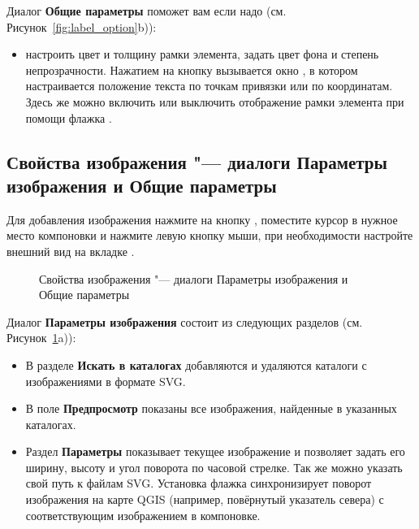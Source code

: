 
Диалог \textbf{Общие параметры} поможет вам если надо
(см. Рисунок~\ref{fig:label_option}b)):

\begin{itemize}[label=--]
\item настроить цвет и толщину рамки элемента, задать
цвет фона и степень непрозрачности. Нажатием на кнопку 
вызывается окно , в котором настраивается
положение текста по точкам привязки или по координатам. Здесь же можно
включить или выключить отображение рамки элемента при помощи флажка
.
\end{itemize}

\subsection{Свойства изображения "--- диалоги Параметры изображения и Общие параметры}

Для добавления изображения нажмите на кнопку
, поместите
курсор в нужное место компоновки и нажмите левую кнопку мыши, при
необходимости настройте внешний вид на вкладке .

\begin{figure}[ht]
\centering
     \hspace{1cm}
   \caption{Свойства изображения "--- диалоги Параметры изображения и Общие параметры \nixcaption}\label{fig:imageoptions}
\end{figure}


Диалог \textbf{Параметры изображения} состоит из следующих
разделов (см. Рисунок~\ref{fig:imageoptions}a)):

\begin{itemize}[label=--]
\item В разделе \textbf{Искать в каталогах} добавляются и удаляются
каталоги с изображениями в формате SVG.
\item В поле \textbf{Предпросмотр} показаны все изображения, найденные
в указанных каталогах.
\item Раздел \textbf{Параметры} показывает текущее изображение и
позволяет задать его ширину, высоту и угол поворота по часовой стрелке.
Так же можно указать свой путь к файлам SVG. Установка флажка
 синхронизирует поворот изображения
на карте QGIS (например, повёрнутый указатель севера) с соответствующим
изображением в компоновке.
\end{itemize}

